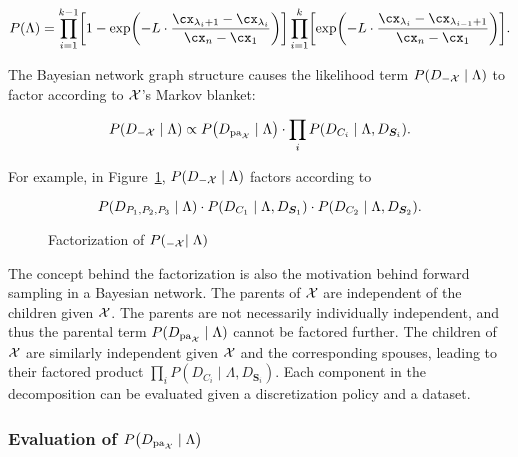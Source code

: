\begin{small}
\begin{equation}
  \label{eq:p_M}
  P(\Lambda) = \prod_{i=1}^{k-1}
    \brock{
      1 - \exp\paren{
        - L \cdot \frac{
                         \cx_{\lambda_i +1} - \cx_{\lambda_i}
                       }{
                         \cx_n - \cx_1
                        }
      }
    }
    \prod_{i=1}^{k}
	\brock{
    \exp\paren{
      -L \cdot \frac{\cx_{\lambda_{i}} - \cx_{\lambda_{i-1} + 1}}{\cx_n - \cx_1}}
    }\text{.}
\end{equation}
\end{small}

The Bayesian network graph structure causes the likelihood term ${P(D_{-\mathcal{X}} \mid \Lambda)}$ to factor according to $\mathcal{X}$'s Markov blanket:

\begin{equation}
  \label{eq:p_D_given_M}
  P\paren{D_{-\cX} \mid \Lambda} \propto P\paren{D_{\Pa_\cX} \mid \Lambda} \cdot \prod_{i} P\paren{D_{C_i} \mid \Lambda, D_{\bm{S}_i}}\text{.}
\end{equation}

For example, in Figure~\ref{fig:example_factorization}, $P(D_{-\mathcal{X}} \mid \Lambda)$ factors according to

\begin{equation}
  P\paren{D_{P_1,P_2,P_3} \mid \Lambda} \cdot P\paren{ D_{ C_1 } \mid \Lambda, D_{\bm{S}_1} } \cdot P\paren{D_{C_2} \mid \Lambda, D_{\bm{S}_2}}\text{.}
\end{equation}

\begin{figure}[ht]
  \centering
  
  \caption{Factorization of $P(_{-\mathcal{X}} \mid \Lambda)$}
  \label{fig:example_factorization}
\end{figure}

The concept behind the factorization is also the motivation behind forward sampling in a Bayesian network.
The parents of $\mathcal{X}$ are independent of the children given $\mathcal{X}$.
The parents are not necessarily individually independent, and thus the parental term $P(D_{\operatorname{pa}_{\mathcal{X}}} \mid \Lambda)$ cannot be factored further.
The children of $\mathcal{X}$ are similarly independent given $\mathcal{X}$ and the corresponding spouses, leading to their factored product $\prod_{i} P(D_{C_i} \mid \Lambda, D_{\bm{S}_i})$.
Each component in the decomposition can be evaluated given a discretization policy and a dataset.

\subsubsection{Evaluation of $P\paren{D_{\Pa_{\cX}} \mid \Lambda}$}

